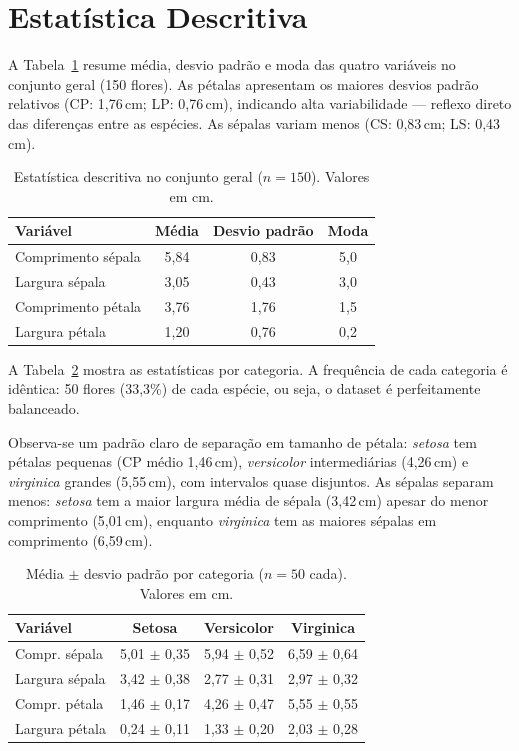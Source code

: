 \documentclass[conference]{IEEEtran}
\begin{document}
\section{Estatística Descritiva}
\label{sec:descritiva}

A Tabela~\ref{tab:geral} resume média, desvio padrão e moda das quatro variáveis no conjunto geral (150 flores). As pétalas apresentam os maiores desvios padrão relativos (CP: 1,76\,cm; LP: 0,76\,cm), indicando alta variabilidade — reflexo direto das diferenças entre as espécies. As sépalas variam menos (CS: 0,83\,cm; LS: 0,43\,cm).

\begin{table}[htbp]
\caption{Estatística descritiva no conjunto geral ($n=150$). Valores em cm.}
\label{tab:geral}
\centering
\begin{tabular}{lccc}
\hline
Variável & Média & Desvio padrão & Moda \\
\hline
Comprimento sépala & 5,84 & 0,83 & 5,0 \\
Largura sépala & 3,05 & 0,43 & 3,0 \\
Comprimento pétala & 3,76 & 1,76 & 1,5 \\
Largura pétala & 1,20 & 0,76 & 0,2 \\
\hline
\end{tabular}
\end{table}

A Tabela~\ref{tab:classes} mostra as estatísticas por categoria. A frequência de cada categoria é idêntica: 50 flores (33,3\%) de cada espécie, ou seja, o dataset é perfeitamente balanceado.

Observa-se um padrão claro de separação em tamanho de pétala: \textit{setosa} tem pétalas pequenas (CP médio 1,46\,cm), \textit{versicolor} intermediárias (4,26\,cm) e \textit{virginica} grandes (5,55\,cm), com intervalos quase disjuntos. As sépalas separam menos: \textit{setosa} tem a maior largura média de sépala (3,42\,cm) apesar do menor comprimento (5,01\,cm), enquanto \textit{virginica} tem as maiores sépalas em comprimento (6,59\,cm).

\begin{table}[htbp]
\caption{Média $\pm$ desvio padrão por categoria ($n=50$ cada). Valores em cm.}
\label{tab:classes}
\centering
\begin{tabular}{lccc}
\hline
Variável & Setosa & Versicolor & Virginica \\
\hline
Compr. sépala & 5,01 $\pm$ 0,35 & 5,94 $\pm$ 0,52 & 6,59 $\pm$ 0,64 \\
Largura sépala & 3,42 $\pm$ 0,38 & 2,77 $\pm$ 0,31 & 2,97 $\pm$ 0,32 \\
Compr. pétala & 1,46 $\pm$ 0,17 & 4,26 $\pm$ 0,47 & 5,55 $\pm$ 0,55 \\
Largura pétala & 0,24 $\pm$ 0,11 & 1,33 $\pm$ 0,20 & 2,03 $\pm$ 0,28 \\
\hline
\end{tabular}
\end{table}
\end{document}
